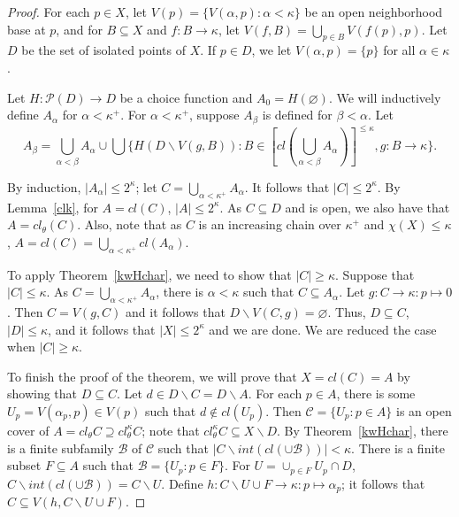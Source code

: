\documentclass[11pt]{amsart}
\theoremstyle{definition}
\theoremstyle{remark}
\numberwithin{equation}{section}
\begin{document}
\begin{proof}
For each $p \in X$, let $V(p) = \{V({\alpha}, p): \alpha < \kappa\}$ be an open neighborhood base at  $p$, and for $B \subseteq X$ and $f:B \rightarrow \kappa$, let $V(f,B) = \bigcup_{p \in B}V(f(p),p)$.  Let $D$ be the set of isolated points of $X$. If $p \in D$, we let $V({\alpha},p) = \{p\}$ for all ${\alpha} \in {\kappa}$.

Let $H:{\ensuremath{\mathcal{{P}}}}(D) \rightarrow D$ be a choice function and $A_0 = {H(\varnothing)}$. We will inductively define $A_{\alpha}$ for $\alpha < \kappa^+$. For $\alpha < \kappa^{+}$, suppose $A_{\beta}$ is defined for $\beta < \alpha$. 
Let $$A_{\beta}  =   \bigcup_{\alpha < \beta}A_{\alpha}  \cup  \bigcup\{H(D\backslash V(g,B)): B \in [cl(\bigcup_{\alpha < \beta}A_{\alpha}) ]^{\leq\kappa}, g:B\rightarrow\kappa \}.$$ 

By induction, $|A_{\alpha}| \leq 2^{\kappa}$; let $C = \bigcup_{\alpha < \kappa^+}A_{\alpha}$.  It  follows that  $|C| \leq 2^{\kappa}$.  By Lemma~\ref{clk}, for $A = cl(C)$, $|A| \leq 2^{\kappa}$.  As $C \subseteq D$ and is open, we also have that $A = cl_{\theta}(C)$.  Also, note that as $C$ is an increasing chain over $\kappa^+$ and $\chi(X) \leq \kappa$,  $A = cl(C) =  \bigcup_{\alpha < \kappa^+}cl(A_{\alpha})$.
 
To apply Theorem~\ref{kwHchar},  we need to show that $|C| \geq \kappa$.  Suppose that 
 $|C| \leq \kappa$. As $C = \bigcup_{\alpha < \kappa^+}A_{\alpha}$, there is $\alpha < \kappa$ such that $C \subseteq A_{\alpha}$.  Let $g:C \rightarrow \kappa: p\mapsto 0$.  Then $C = V(g,C)$ and it follows that $D\backslash V(C,g) = \varnothing$.  Thus, $D \subseteq C$, $|D| \leq \kappa$, and it follows that $|X| \leq 2^{\kappa}$ and we are done.  We are reduced the case when $|C| \geq \kappa$.
   
To finish the proof of the theorem, we will prove that $X = cl(C)=A$ by showing that $D \subseteq C$.  Let $d \in D\backslash C = D\backslash A$. For each $p \in A$, there is some $U_p = V({\alpha}_p,p) \in V(p)$ such that $d \not\in cl(U_p)$.  Then ${\ensuremath{\mathcal{{C}}}}= \{U_p: p \in A\}$ is an open cover of $A = cl_{\theta}C \supseteq  cl_{\theta}^{\kappa}C $; note that $cl_{\theta}^{\kappa}C {\subseteq} X\backslash D$.
 By Theorem~\ref{kwHchar}, there is a finite subfamily ${\ensuremath{\mathcal{{B}}}}$ of ${\ensuremath{\mathcal{{C}}}}$ such that $|C\backslash int(cl(\cup{\ensuremath{\mathcal{{B}}}}))| < \kappa$. There is a finite subset $F \subseteq A$ such that ${\ensuremath{\mathcal{{B}}}} = \{U_p: p \in F\}$.  For $U = \cup_{p \in F}U_p\cap D$, $C \backslash  int(cl(\cup{\ensuremath{\mathcal{{B}}}})) = C \backslash U$.  Define $h: C\backslash U \cup F \rightarrow \kappa: p\mapsto {\alpha}_p$; it follows that $C \subseteq V(h,C\backslash U \cup F)$.  
 

\end{proof}
\end{document}
